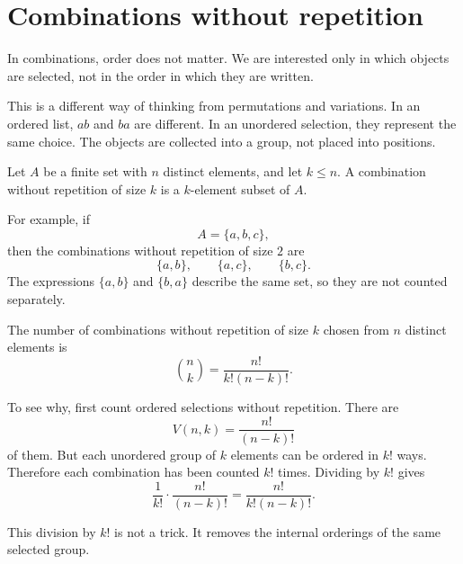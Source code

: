 \section{Combinations without repetition}

In combinations, order does not matter. We are interested only in which objects are selected, not in the order in which they are written.

This is a different way of thinking from permutations and variations. In an ordered list, \(ab\) and \(ba\) are different. In an unordered selection, they represent the same choice. The objects are collected into a group, not placed into positions.

\begin{definitionbox}
Let \(A\) be a finite set with \(n\) distinct elements, and let \(k\leq n\). A combination without repetition of size \(k\) is a \(k\)-element subset of \(A\).
\end{definitionbox}

For example, if
\[
A=\{a,b,c\},
\]
then the combinations without repetition of size \(2\) are
\[
\{a,b\},\qquad \{a,c\},\qquad \{b,c\}.
\]
The expressions \(\{a,b\}\) and \(\{b,a\}\) describe the same set, so they are not counted separately.

\begin{center}
\end{center}

\begin{theorembox}
The number of combinations without repetition of size \(k\) chosen from \(n\) distinct elements is
\[
\binom{n}{k}=\frac{n!}{k!(n-k)!}.
\]
\end{theorembox}

To see why, first count ordered selections without repetition. There are
\[
V(n,k)=\frac{n!}{(n-k)!}
\]
of them. But each unordered group of \(k\) elements can be ordered in \(k!\) ways. Therefore each combination has been counted \(k!\) times. Dividing by \(k!\) gives
\[
\frac{1}{k!}\cdot \frac{n!}{(n-k)!}=\frac{n!}{k!(n-k)!}.
\]

This division by \(k!\) is not a trick. It removes the internal orderings of the same selected group.

